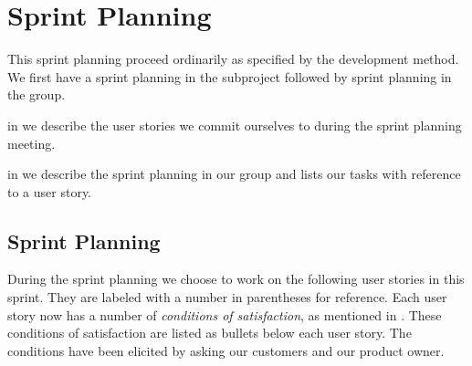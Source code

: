 \chapter{Sprint Planning}\label{chap:s4_sprintplanning}
This sprint planning proceed ordinarily as specified by the development method. We first have a sprint planning in the subproject followed by sprint planning in the group.

\begin{chapterorganization}
  \item in  we describe the user stories we commit ourselves to during the \bd sprint planning meeting.
  \item in  we describe the sprint planning in our group and lists our tasks with reference to a user story.
\end{chapterorganization}

\section{\bdtitle Sprint Planning}\label{sec:S4_bd}
During the \bd sprint planning we choose to work on the following user stories in this sprint. They are labeled with a number in parentheses for reference. Each user story now has a number of \emph{conditions of satisfaction}, as mentioned in . These conditions of satisfaction are listed as bullets below each user story. The conditions have been elicited by asking our customers and our product owner.

